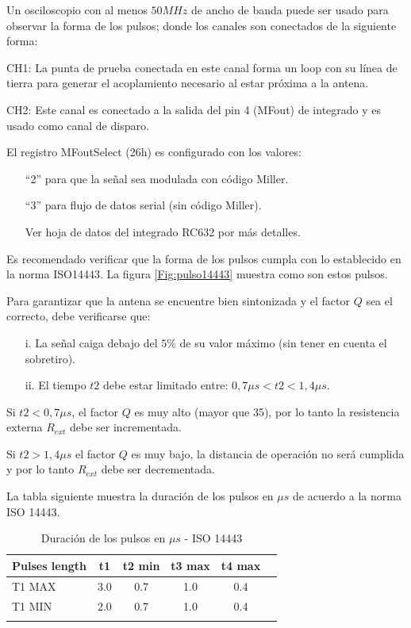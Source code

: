 \bigskip
Un osciloscopio con al menos $50MHz$ de ancho de banda puede ser usado para observar la forma de los pulsos; donde los canales son conectados de la siguiente forma:

\bigskip
CH1:   La punta de prueba conectada en este canal forma un loop con su línea de tierra para generar el acoplamiento necesario al estar próxima a la antena.

\bigskip
CH2:   Este canal es conectado a la salida del pin 4 (MFout) de integrado y es usado como canal de disparo.
\bigskip

El registro MFoutSelect (26h) es configurado con los valores:
\begin{itemize}	
\item[]	“2” para que la señal sea modulada con código Miller.
\item[]	“3” para flujo de datos serial (sin código Miller).
\item[]	Ver hoja de datos del integrado RC632 por más detalles.	
\end{itemize}	

Es recomendado verificar que la forma de los pulsos cumpla con lo establecido en la norma ISO14443. La figura \ref{Fig:pulso14443} muestra como son estos pulsos.


Para garantizar que la antena se encuentre bien sintonizada y el factor $Q$ sea el correcto, debe verificarse que:


\begin{itemize}
\item[i.] La señal caiga debajo del $5\%$ de su valor máximo (sin tener en cuenta el sobretiro).
\item[ii.] El tiempo $t2$ debe estar limitado entre:  $0,7\mu s < t2 < 1,4\mu s$.
\end{itemize}

Si $t2 < 0,7\mu s$, el factor $Q$ es muy alto (mayor que 35), por lo tanto la resistencia externa $R_{ext}$ debe ser incrementada.

\bigskip
Si  $t2 > 1,4\mu s$ el factor $Q$ es muy bajo, la distancia de operación no será cumplida y por lo tanto $R_{ext}$ debe ser decrementada.

\bigskip
La tabla siguiente muestra la duración de los pulsos en $\mu s$ de acuerdo a la norma ISO 14443.

\begin{longtable}{|l|c|c|c|c|r|}
\hline
\multicolumn{1}{|c|}{\textbf{Pulses length}} & \textbf{t1} & \textbf{t2 min} & \textbf{t3 max} & \textbf{t4 max} \\ \hline

T1 MAX 			 &          3.0    &       0.7    &            1.0 &                0.4 \\ \hline
T1 MIN 			 &          2.0    &       0.7    &            1.0 &                0.4 \\ \hline
\caption{Duración de los pulsos en $\mu s$ - ISO 14443}
\label{}
\end{longtable}

